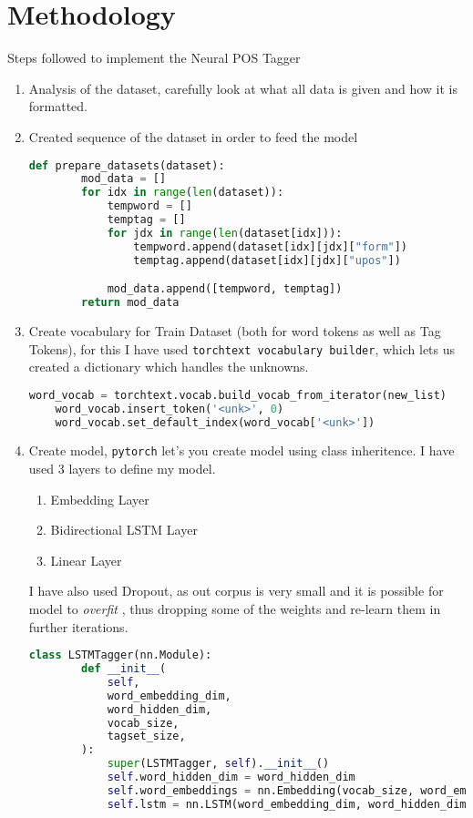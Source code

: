 
\section{Methodology}

Steps followed to implement the Neural POS Tagger

\begin{enumerate}
	\item Analysis of the dataset, carefully look at what all data is given and how it is formatted.
	\item Created sequence of the dataset in order to feed the model
	\begin{lstlisting}[language=Python]
	def prepare_datasets(dataset):
    	mod_data = []
   		for idx in range(len(dataset)):
       		tempword = []
       		temptag = []
       		for jdx in range(len(dataset[idx])):
           		tempword.append(dataset[idx][jdx]["form"])
           		temptag.append(dataset[idx][jdx]["upos"])

        	mod_data.append([tempword, temptag])
    	return mod_data
	\end{lstlisting}
	
	\item Create vocabulary for Train Dataset (both for word tokens as well as Tag Tokens), for this I have used \texttt{torchtext vocabulary builder}, which lets us created a dictionary which handles the unknowns.
	\begin{lstlisting}[language=Python]
	word_vocab = torchtext.vocab.build_vocab_from_iterator(new_list)
	word_vocab.insert_token('<unk>', 0)            
	word_vocab.set_default_index(word_vocab['<unk>'])
	\end{lstlisting}

	\item Create model, \texttt{pytorch} let's you create model using class inheritence. I have used 3 layers to define my model.
		\begin{enumerate}
			\item Embedding Layer
			\item Bidirectional LSTM Layer
			\item Linear Layer
		\end{enumerate}
		I have also used Dropout, as out corpus is very small and it is possible for model to \textit{overfit}	, thus dropping some of the weights and re-learn them in further iterations.
	\begin{lstlisting}[language=Python]
	class LSTMTagger(nn.Module):
    	def __init__(
        	self,
        	word_embedding_dim,
        	word_hidden_dim,
        	vocab_size,
        	tagset_size,
    	):
        	super(LSTMTagger, self).__init__()
        	self.word_hidden_dim = word_hidden_dim
        	self.word_embeddings = nn.Embedding(vocab_size, word_embedding_dim)
        	self.lstm = nn.LSTM(word_embedding_dim, word_hidden_dim, num_layers = 1, bidirectional = True)


\end{lstlisting}
\end{enumerate}
